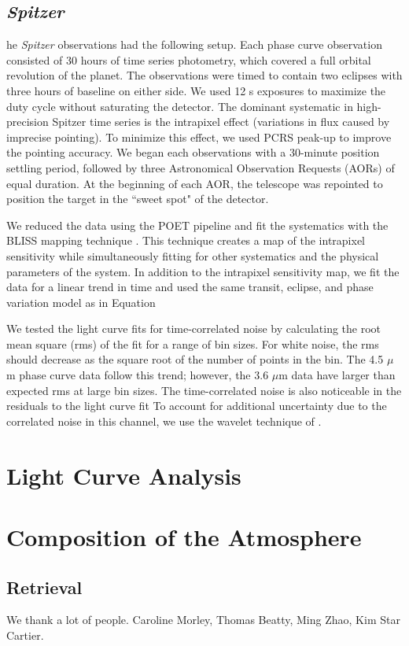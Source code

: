 \documentclass[twocolumn]{aastex61}
\newcommand{\project}[1]{\textsl{#1}}
\newcommand{\Spitzer}{\project{Spitzer}}
\begin{document}
\subsection{\Spitzer}
he \emph{Spitzer} observations had the following setup. Each phase curve observation consisted of 30 hours of time series photometry, which covered a full orbital revolution of the planet. The observations were timed to contain two eclipses with three hours of baseline on either side. We used 12 s exposures to maximize the duty cycle without saturating the detector. The dominant systematic in high-precision Spitzer time series is the intrapixel effect (variations in flux caused by imprecise pointing). To minimize this effect, we used PCRS peak-up to improve the pointing accuracy. We began each observations with a 30-minute position settling period, followed by three Astronomical Observation Requests (AORs) of equal duration. At the beginning of each AOR, the telescope was repointed to position the target in the ``sweet spot" of the detector.

We reduced the data using the POET pipeline and fit the systematics with the BLISS mapping technique \citep{stevenson12}. This technique creates a map of the intrapixel sensitivity while simultaneously fitting for other systematics and the physical parameters of the system. In addition to the intrapixel sensitivity map, we fit the data for a linear trend in time and used the same transit, eclipse, and phase variation model as in Equation%

We tested the light curve fits for time-correlated noise by calculating the root mean square (rms) of the fit for a range of bin sizes. For white noise, the rms should decrease as the square root of the number of points in the bin. The 4.5 $\mu$m phase curve data follow this trend; however, the 3.6 $\mu$m data have larger than expected rms at large bin sizes. The time-correlated noise is also noticeable in the residuals to the light curve fit %
To account for additional uncertainty due to the correlated noise in this channel, we use the wavelet technique of \cite{carter09}.



\section{Light Curve Analysis}

\section{Composition of the Atmosphere}

\subsection{Retrieval}


\acknowledgments
We thank a lot of people. Caroline Morley, Thomas Beatty, Ming Zhao, Kim Star Cartier.



\end{document}
